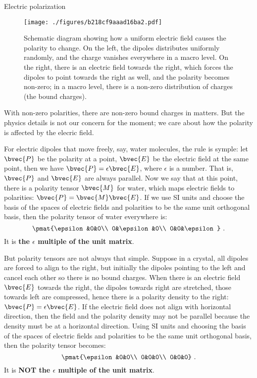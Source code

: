 \begin{example}{Electric polarization}
\begin{figure}[ht]
\centering
\texttt{[image: ./figures/b218cf9aaad16ba2.pdf]}
\caption{Schematic diagram showing how a uniform electric field causes the polarity to change. On the left, the dipoles distributes uniformly randomly, and the charge vanishes everywhere in a macro level. On the right, there is an electric field towards the right, which forces the dipoles to point towards the right as well, and the polarity becomes non-zero; in a macro level, there is a non-zero distribution of charges (the bound charges). } \label{fig_TestT_1}
\end{figure}




With non-zero polarities, there are non-zero bound charges in matters. But the physics details is not our concern for the moment; we care about how the polarity is affected by the elecric field. 

For electric dipoles that move freely, say, water molecules, the rule is symple: let $\bvec{P}$ be the polarity at a point, $\bvec{E}$ be the electric field at the same point, then we have $\bvec{P}=\epsilon\bvec{E}$, where $\epsilon$ is a number. That is, $\bvec{P}$ and $\bvec{E}$ are always parallel. Now we say that at this point, there is a polarity tensor $\bvec{M}$ for water, which maps electric fields to polarities: $\bvec{P}=\bvec{M}\bvec{E}$. If we use SI units and choose the basis of the spaces of electric fields and polarities to be the same unit orthogonal basis, then the polarity tensor of water everywhere is: 
\begin{equation}
\pmat{\epsilon&0&0\\ 0&\epsilon&0\\ 0&0&\epsilon}~.
\end{equation}
It is \textbf{the $\epsilon$ multiple of the unit matrix}. 

But polarity tensors are not always that simple. Suppose in a crystal, all dipoles are forced to align to the right, but initially the dipoles pointing to the left and cancel each other so there is no bound charges. When there is an electric field $\bvec{E}$ towards the right, the dipoles towards right are stretched, those towards left are compressed, hence there is a polarity density to the right: $\bvec{P}=\epsilon\bvec{E}$. If the electric field does not align with horizontal direction, then the field and the polarity density may not be parallel because the density must be at a horizontal direction. Using SI units and choosing the basis of the spaces of electric fields and polarities to be the same unit orthogonal basis, then the polarity tensor becomes: 
\begin{equation}
\pmat{\epsilon&0&0\\ 0&0&0\\ 0&0&0}~.
\end{equation}
It is \textbf{NOT the $\epsilon$ multiple of the unit matrix}. 


\end{example}
